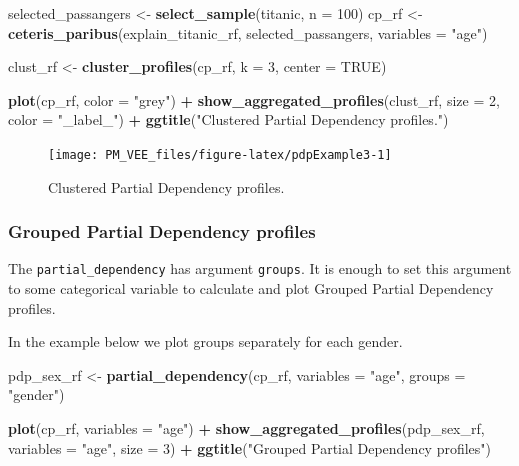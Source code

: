 \documentclass[12pt,]{krantz}
\newenvironment{Shaded}{\begin{snugshade}}{\end{snugshade}}
\newcommand{\DataTypeTok}[1]{\textcolor[rgb]{0.13,0.29,0.53}{#1}}
\newcommand{\DecValTok}[1]{\textcolor[rgb]{0.00,0.00,0.81}{#1}}
\newcommand{\KeywordTok}[1]{\textcolor[rgb]{0.13,0.29,0.53}{\textbf{#1}}}
\newcommand{\NormalTok}[1]{#1}
\newcommand{\OperatorTok}[1]{\textcolor[rgb]{0.81,0.36,0.00}{\textbf{#1}}}
\newcommand{\OtherTok}[1]{\textcolor[rgb]{0.56,0.35,0.01}{#1}}
\newcommand{\StringTok}[1]{\textcolor[rgb]{0.31,0.60,0.02}{#1}}
\begin{document}
\begin{Shaded}
\begin{Highlighting}[]
\NormalTok{selected_passangers <-}\StringTok{ }\KeywordTok{select_sample}\NormalTok{(titanic, }\DataTypeTok{n =} \DecValTok{100}\NormalTok{)}
\NormalTok{cp_rf <-}\StringTok{ }\KeywordTok{ceteris_paribus}\NormalTok{(explain_titanic_rf, selected_passangers, }\DataTypeTok{variables =} \StringTok{"age"}\NormalTok{)}

\NormalTok{clust_rf <-}\StringTok{ }\KeywordTok{cluster_profiles}\NormalTok{(cp_rf, }\DataTypeTok{k =} \DecValTok{3}\NormalTok{, }\DataTypeTok{center =} \OtherTok{TRUE}\NormalTok{)}

\KeywordTok{plot}\NormalTok{(cp_rf, }\DataTypeTok{color =} \StringTok{"grey"}\NormalTok{) }\OperatorTok{+}
\StringTok{  }\KeywordTok{show_aggregated_profiles}\NormalTok{(clust_rf, }\DataTypeTok{size =} \DecValTok{2}\NormalTok{, }\DataTypeTok{color =} \StringTok{"_label_"}\NormalTok{) }\OperatorTok{+}
\StringTok{  }\KeywordTok{ggtitle}\NormalTok{(}\StringTok{"Clustered Partial Dependency profiles."}\NormalTok{) }
\end{Highlighting}
\end{Shaded}

\begin{figure}

{\centering \texttt{[image: PM\_VEE\_files/figure-latex/pdpExample3-1]} 

}

\caption{Clustered Partial Dependency profiles.}\label{fig:pdpExample3}
\end{figure}

\hypertarget{grouped-partial-dependency-profiles-2}{%
\subsubsection{Grouped Partial Dependency profiles}\label{grouped-partial-dependency-profiles-2}}

The \texttt{partial\_dependency} has argument \texttt{groups}. It is enough to set this argument to some categorical variable to calculate and plot Grouped Partial Dependency profiles.

In the example below we plot groups separately for each gender.

\begin{Shaded}
\begin{Highlighting}[]
\NormalTok{pdp_sex_rf <-}\StringTok{ }\KeywordTok{partial_dependency}\NormalTok{(cp_rf, }\DataTypeTok{variables =} \StringTok{"age"}\NormalTok{,}
                \DataTypeTok{groups =} \StringTok{"gender"}\NormalTok{)}

\KeywordTok{plot}\NormalTok{(cp_rf, }\DataTypeTok{variables =} \StringTok{"age"}\NormalTok{) }\OperatorTok{+}
\StringTok{  }\KeywordTok{show_aggregated_profiles}\NormalTok{(pdp_sex_rf, }\DataTypeTok{variables =} \StringTok{"age"}\NormalTok{, }\DataTypeTok{size =} \DecValTok{3}\NormalTok{) }\OperatorTok{+}
\StringTok{  }\KeywordTok{ggtitle}\NormalTok{(}\StringTok{"Grouped Partial Dependency profiles"}\NormalTok{) }
\end{Highlighting}
\end{Shaded}
\end{document}
